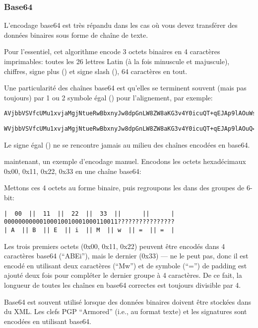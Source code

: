 \subsubsection{Base64}

L'encodage base64 est très répandu dans les cas où vous devez transférer des données
binaires sous forme de chaîne de texte.

Pour l'essentiel, cet algorithme encode 3 octets binaires en 4 caractères imprimables:
toutes les 26 lettres Latin (à la fois minuscule et majuscule), chiffres, signe plus
(\q{+}) et signe slash (\q{/}), 64 caractères en tout.

Une particularité des chaînes base64 est qu'elles se terminent souvent (mais pas
toujours) par 1 ou 2 symbole égal (\q{=}) pour l'alignement, par exemple:

\begin{lstlisting}
AVjbbVSVfcUMu1xvjaMgjNtueRwBbxnyJw8dpGnLW8ZW8aKG3v4Y0icuQT+qEJAp9lAOuWs=
\end{lstlisting}

\begin{lstlisting}
WVjbbVSVfcUMu1xvjaMgjNtueRwBbxnyJw8dpGnLW8ZW8aKG3v4Y0icuQT+qEJAp9lAOuQ==
\end{lstlisting}

Le signe égal (\q{=}) ne se rencontre jamais au milieu des chaînes encodées en base64.

maintenant, un exemple d'encodage manuel.
Encodons les octets hexadécimaux 0x00, 0x11, 0x22, 0x33 en une chaîne base64:



Mettons ces 4 octets au forme binaire, puis regroupons les dans des groupes de 6-bit:

\begin{lstlisting}
|  00  ||  11  ||  22  ||  33  ||      ||      |
00000000000100010010001000110011????????????????
| A  || B  || E  || i  || M  || w  || =  || =  |
\end{lstlisting}

Les trois premiers octets (0x00, 0x11, 0x22) peuvent être encodés dans 4 caractères
base64 (``ABEi''), mais le dernier (0x33) --- ne le peut pas, donc il est encodé
en utilisant deux caractères (``Mw'') et de symbole (``='') de padding est ajouté
deux fois pour compléter le dernier groupe à 4 caractères.
De ce fait, la longueur de toutes les chaînes en base64 correctes est toujours divisible
par 4.

Base64 est souvent utilisé lorsque des données binaires doivent être stockées dans
du XML.  Les clefs PGP ``Armored'' (i.e., au format texte) et les signatures sont
encodées en utilisant base64.

